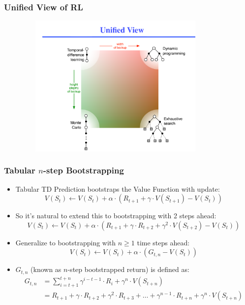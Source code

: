 \documentclass[handout]{beamer}
\begin{document}
\begin{frame}
\frametitle{Unified View of RL}
\includegraphics[width=12cm, height=7cm]{unified_view.png}
\end{frame}





\begin{frame}
\frametitle{Tabular $n$-step Bootstrapping}
\pause
\begin{itemize}[<+->]
\item Tabular TD Prediction bootstraps the Value Function with update:
$$V(S_t) \leftarrow V(S_t) + \alpha \cdot (R_{t+1} + \gamma \cdot V(S_{t+1}) - V(S_t))$$
\item So it's natural to extend this to bootstrapping with 2 steps ahead:
$$V(S_t) \leftarrow V(S_t) + \alpha \cdot (R_{t+1} + \gamma \cdot R_{t+2} + \gamma^2 \cdot V(S_{t+2})- V(S_t))$$
\item Generalize to bootstrapping with $n \geq 1$ time steps ahead:
$$V(S_t) \leftarrow V(S_t) + \alpha \cdot (G_{t,n} - V(S_t))$$
\item $G_{t,n}$ (known as $n$-step bootstrapped return) is defined as:
\begin{align*}
G_{t,n} & = \sum_{i=t+1}^{t+n} \gamma^{i-t-1} \cdot R_i  + \gamma^n \cdot V(S_{t+n}) \\
& = R_{t+1} + \gamma \cdot R_{t+2} + \gamma^2 \cdot R_{t+3} + \ldots + \gamma^{n-1} \cdot R_{t+n} + \gamma^n \cdot V(S_{t+n})
\end{align*}
\end{itemize}
\end{frame}
\end{document}
